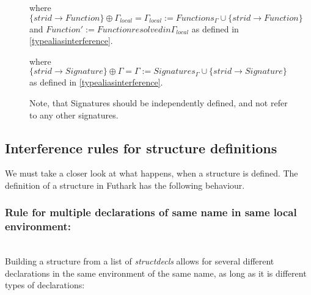 \begin{figure}\label{Rule2fun}
  \begin{tcolorbox}
    \begin{prooftree}
    \end{prooftree} where
    $\{ strid \to Function \} \oplus \Gamma_{local} = \Gamma_{local} := Functions_{\Gamma} \cup \{strid \to Function\}$ and $Function' := Function resolved in \Gamma_{local}$ as defined in
    \ref{typealiasinterference}.
  \end{tcolorbox}
\end{figure}

\begin{figure}\label{Rule2sig}
  \begin{tcolorbox}
    \begin{prooftree}
    \end{prooftree} where
    $\{ strid \to Signature \} \oplus \Gamma = \Gamma := Signatures_{\Gamma} \cup \{strid \to Signature\}$ as defined in
    \ref{typealiasinterference}.
    
    Note, that Signatures should be independently defined, and not refer to any
    other signatures.
  \end{tcolorbox}
\end{figure}

\subsection{Interference rules for structure definitions}
We must take a closer look at what happens, when a structure is defined.
The definition of a structure in Futhark has the following behaviour.
\subsubsection{Rule for multiple declarations of same name in same local environment:}\\
Building a structure from a list of \textit{structdecls} allows for several
different declarations in the same environment of the same name, as long as
it is different types of declarations:\\
\\

